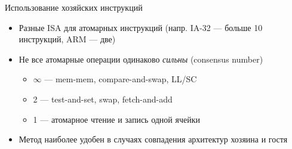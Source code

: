 \documentclass{beamer}
\begin{document}
\begin{frame}{Использование хозяйских инструкций}
\begin{itemize}
    \item Разные ISA для атомарных инструкций (напр. IA-32 — больше 10 инструкций, ARM — две)
    \item Не все атомарные операции одинаково \emph{сильны} (consensus number)~\cite{consensus-number}
    \begin{itemize}
        \item $\infty$ — mem-mem, compare-and-swap, LL/SC
        \item 2 — test-and-set, swap, fetch-and-add
        \item 1 — атомарное чтение и запись одной ячейки
    \end{itemize}
    \item Метод наиболее удобен в случаях совпадения архитектур хозяина и гостя
\end{itemize}
\end{frame}
\end{document}
